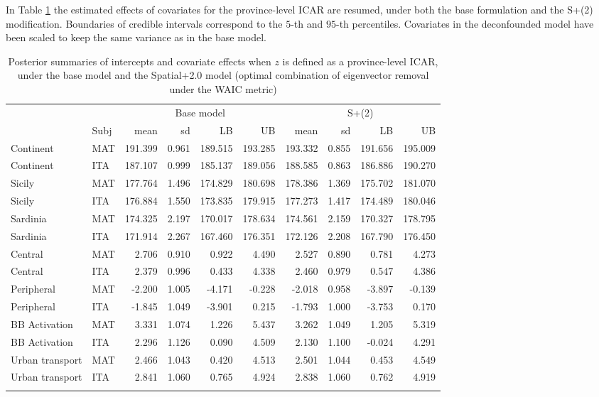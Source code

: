 \documentclass{book}
\begin{document}
In Table \ref{tab:fix} the estimated effects of covariates for the province-level ICAR are resumed, under both the base formulation and the S+(2) modification. Boundaries of credible intervals correspond to the $5$-th and $95$-th percentiles. Covariates in the deconfounded model have been scaled to keep the same variance as in the base model.

\begin{table}[ht]
\centering
\begin{tabular}{ll|rrrr|rrrr}
  \toprule
  && \multicolumn{4}{c|}{Base model} & \multicolumn{4}{c}{S+(2)}\\
 & Subj & mean & sd & LB & UB & mean & sd & LB & UB \\ 
  \midrule
Continent & MAT & 191.399 & 0.961 & 189.515 & 193.285 & 193.332 & 0.855 & 191.656 & 195.009 \\ 
  Continent & ITA & 187.107 & 0.999 & 185.137 & 189.056 & 188.585 & 0.863 & 186.886 & 190.270 \\ 
  Sicily & MAT & 177.764 & 1.496 & 174.829 & 180.698 & 178.386 & 1.369 & 175.702 & 181.070 \\ 
  Sicily & ITA & 176.884 & 1.550 & 173.835 & 179.915 & 177.273 & 1.417 & 174.489 & 180.046 \\ 
  Sardinia & MAT & 174.325 & 2.197 & 170.017 & 178.634 & 174.561 & 2.159 & 170.327 & 178.795 \\ 
  Sardinia & ITA & 171.914 & 2.267 & 167.460 & 176.351 & 172.126 & 2.208 & 167.790 & 176.450 \\ 
  Central & MAT & 2.706 & 0.910 & 0.922 & 4.490 & 2.527 & 0.890 & 0.781 & 4.273 \\ 
  Central & ITA & 2.379 & 0.996 & 0.433 & 4.338 & 2.460 & 0.979 & 0.547 & 4.386 \\ 
  Peripheral & MAT & -2.200 & 1.005 & -4.171 & -0.228 & -2.018 & 0.958 & -3.897 & -0.139 \\ 
  Peripheral & ITA & -1.845 & 1.049 & -3.901 & 0.215 & -1.793 & 1.000 & -3.753 & 0.170 \\ 
  BB Activation & MAT & 3.331 & 1.074 & 1.226 & 5.437 & 3.262 & 1.049 & 1.205 & 5.319 \\ 
  BB Activation & ITA & 2.296 & 1.126 & 0.090 & 4.509 & 2.130 & 1.100 & -0.024 & 4.291 \\ 
  Urban transport & MAT & 2.466 & 1.043 & 0.420 & 4.513 & 2.501 & 1.044 & 0.453 & 4.549 \\ 
  Urban transport & ITA & 2.841 & 1.060 & 0.765 & 4.924 & 2.838 & 1.060 & 0.762 & 4.919 \\ 
   \botrule
\end{tabular}
\caption{Posterior summaries of intercepts and covariate effects when $z$ is defined as a province-level ICAR, under the base model and the Spatial+2.0 model (optimal combination of eigenvector removal under the WAIC metric)}
\label{tab:fix}
\end{table}
\end{document}
